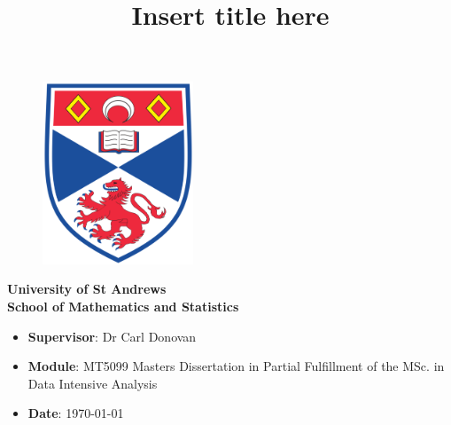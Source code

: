 \documentclass[a4paper]{article}
\begin{document}
\title{Insert title here}
\author{}
\date{}
 \thispagestyle{empty}
	
	\begin{titlepage}
		\vspace{\fill}
		\maketitle
		 \thispagestyle{empty}
		\begin{figure}[H]
			\centering
			\includegraphics[width=0.4\textwidth]{Images/SchoolLogo.png}
		\end{figure}
		\begin{center}
			\Large\textbf{University of St Andrews}\\
			\vspace{1cm}
			\Large\textbf{School of Mathematics and Statistics}
		\end{center}
		
		\vspace{\fill}
		\Large%
		\begin{itemize}
			\renewcommand\labelitemi{--}
			\item[] \textbf{Supervisor}: Dr Carl Donovan  
			\item[] \textbf{Module}: MT5099 Masters Dissertation in Partial Fulfillment of the MSc. in Data Intensive Analysis
			\item[] \textbf{Date}: \today
		\end{itemize}
		\vspace{\fill}
	\end{titlepage}


\tableofcontents











\end{document}
